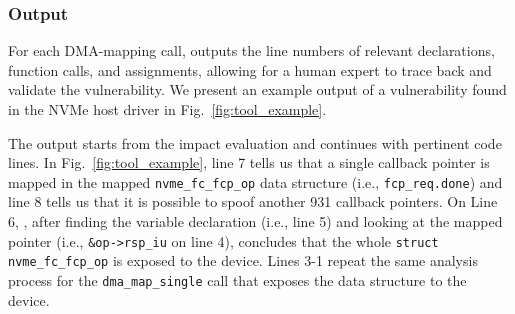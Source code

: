 
\subsubsection{Output}
%
For each DMA-mapping call, \tool outputs the line numbers of relevant declarations, function calls, and assignments, allowing for a human expert to trace back and validate the vulnerability. We present an example output of a vulnerability found in the NVMe host driver in Fig.~\ref{fig:tool_example}.

The output starts from the impact evaluation and continues with pertinent code lines. %
In Fig.~\ref{fig:tool_example}, line 7 tells us that a single callback pointer is mapped in the mapped \texttt{nvme\_fc\_fcp\_op} data structure (i.e., \texttt{fcp\_req.done}) and line 8 tells us that it is possible to spoof another 931 callback pointers.
On Line 6, \tool, after finding the variable declaration (i.e., line 5) and looking at the mapped pointer (i.e., \texttt{\&op->rsp\_iu} on line 4), concludes that the whole \texttt{struct nvme\_fc\_fcp\_op} is exposed to the device. Lines 3-1 repeat the same analysis process for the \texttt{dma\_map\_single} call that exposes the data structure to the device. 

